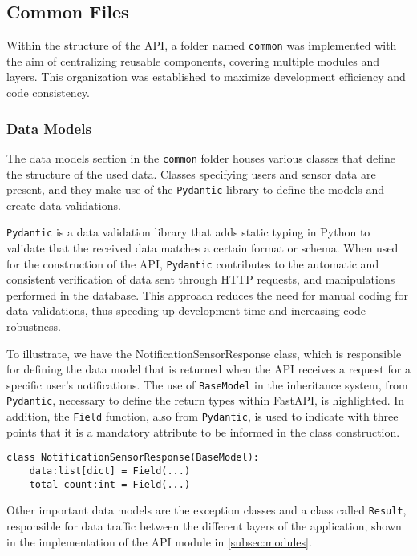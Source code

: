 \subsection{Common Files}\label{subsec:commum}

Within the structure of the \gls{API}, a folder named \texttt{common} was implemented with the aim of centralizing reusable components, covering multiple modules and layers. This organization was established to maximize development efficiency and code consistency.

\subsubsection{Data Models}\label{subsubsec:dataModel}
The data models section in the \texttt{common} folder houses various classes that define the structure of the used data. Classes specifying users and sensor data are present, and they make use of the \texttt{Pydantic} library to define the models and create data validations.

\texttt{Pydantic} \cite{pydanticDocs} is a data validation library that adds static typing in Python to validate that the received data matches a certain format or schema. When used for the construction of the \gls{API}, \texttt{Pydantic} contributes to the automatic and consistent verification of data sent through \gls{HTTP} requests, and manipulations performed in the database. This approach reduces the need for manual coding for data validations, thus speeding up development time and increasing code robustness.

To illustrate, we have the NotificationSensorResponse class, which is responsible for defining the data model that is returned when the \gls{API} receives a request for a specific user's notifications. The use of \texttt{BaseModel} in the inheritance system, from \texttt{Pydantic}, necessary to define the return types within FastAPI, is highlighted. In addition, the \texttt{Field} function, also from \texttt{Pydantic}, is used to indicate with three points that it is a mandatory attribute to be informed in the class construction.

\begin{Verbatim}[fontsize=\small, baselinestretch=0.6]
class NotificationSensorResponse(BaseModel):
    data:list[dict] = Field(...)
    total_count:int = Field(...)
\end{Verbatim}

Other important data models are the exception classes and a class called \texttt{Result}, responsible for data traffic between the different layers of the application, shown in the implementation of the \gls{API} module in \ref{subsec:modules}.

